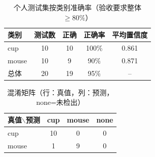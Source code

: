 \begin{table}[htbp]
\centering
\caption{个人测试集按类别准确率（验收要求整体 $\geq 80\%$）}
\begin{tabular}{l c c c c}
\toprule
类别 & 测试数 & 正确 & 正确率 & 平均置信度 \\
\midrule
cup & 10 & 10 & 100\% & 0.861 \\
mouse & 10 & 9 & 90\% & 0.871 \\
\midrule 总体 & 20 & 19 & 95\% & -- \\
\bottomrule
\end{tabular}
\end{table}

\begin{table}[htbp]
\centering
\caption{混淆矩阵（行：真值，列：预测，none=未检出）}
\begin{tabular}{l c c c}
\toprule
真值$\backslash$预测 & cup & mouse & none \\
\midrule
cup & 10 & 0 & 0 \\
mouse & 1 & 9 & 0 \\
\bottomrule
\end{tabular}
\end{table}
